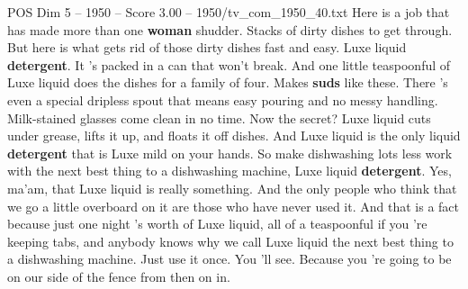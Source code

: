 \begin{textsample}{POS Dim 5 – 1950 – Score 3.00 – 1950/tv\_com\_1950\_40.txt}  \label{ex:f5_pos_050}
Here is a job that has made more than one \textbf{woman} shudder.
Stacks of dirty dishes to get through.
But here is what gets rid of those dirty dishes fast and easy.
Luxe liquid \textbf{detergent}.
It 's packed in a can that won't break.
And one little teaspoonful of Luxe liquid does the dishes for a family of four.
Makes \textbf{suds} like these.
There 's even a special dripless spout that means easy pouring and no messy handling.
Milk-stained glasses come clean in no time.
Now the secret?
Luxe liquid cuts under grease, lifts it up, and floats it off dishes.
And Luxe liquid is the only liquid \textbf{detergent} that is Luxe mild on your hands.
So make dishwashing lots less work with the next best thing to a dishwashing machine, Luxe liquid \textbf{detergent}.
Yes, ma'am, that Luxe liquid is really something.
And the only people who think that we go a little overboard on it are those who have never used it.
And that is a fact because just one night 's worth of Luxe liquid, all of a teaspoonful if you 're keeping tabs, and anybody knows why we call Luxe liquid the next best thing to a dishwashing machine.
Just use it once.
You 'll see.
Because you 're going to be on our side of the fence from then on in.

\end{textsample}
